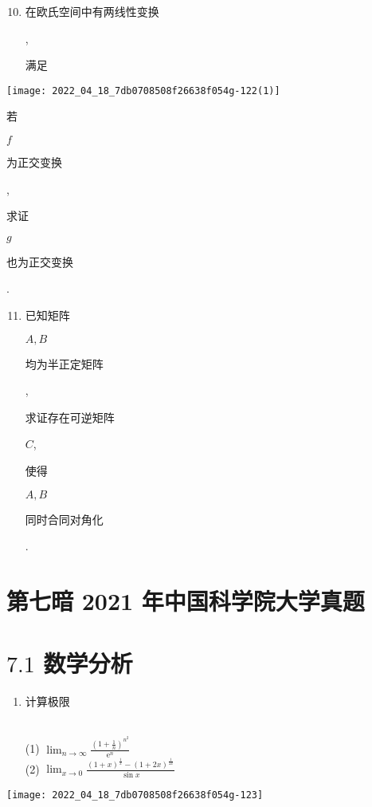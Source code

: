 \documentclass[10pt]{article}
\begin{document}
\begin{enumerate}
  \setcounter{enumi}{9}
  \item \begin{CJK}{UTF8}{mj}在欧氏空间中有两线性变换\end{CJK}, \begin{CJK}{UTF8}{mj}满足\end{CJK}
\end{enumerate}
\texttt{[image: 2022\_04\_18\_7db0708508f26638f054g-122(1)]}

\begin{CJK}{UTF8}{mj}若\end{CJK} $f$ \begin{CJK}{UTF8}{mj}为正交变换\end{CJK}, \begin{CJK}{UTF8}{mj}求证\end{CJK} $g$ \begin{CJK}{UTF8}{mj}也为正交变换\end{CJK}.

\begin{enumerate}
  \setcounter{enumi}{10}
  \item \begin{CJK}{UTF8}{mj}已知矩阵\end{CJK} $A, B$ \begin{CJK}{UTF8}{mj}均为半正定矩阵\end{CJK}, \begin{CJK}{UTF8}{mj}求证存在可逆矩阵\end{CJK} $C$, \begin{CJK}{UTF8}{mj}使得\end{CJK} $A, B$ \begin{CJK}{UTF8}{mj}同时合同对角化\end{CJK}.
\end{enumerate}
\section{第七暗 2021 年中国科学院大学真题}
\section{$7.1$ 数学分析}
\begin{enumerate}
  \item \begin{CJK}{UTF8}{mj}计算极限\end{CJK}\\
(1) $\lim _{n \rightarrow \infty} \frac{\left(1+\frac{1}{n}\right)^{n^{2}}}{\mathrm{e}^{n}}$\\
(2) $\lim _{x \rightarrow 0} \frac{(1+x)^{\frac{1}{x}}-(1+2 x)^{\frac{1}{2 x}}}{\sin x}$
\end{enumerate}
\texttt{[image: 2022\_04\_18\_7db0708508f26638f054g-123]}
\end{document}
